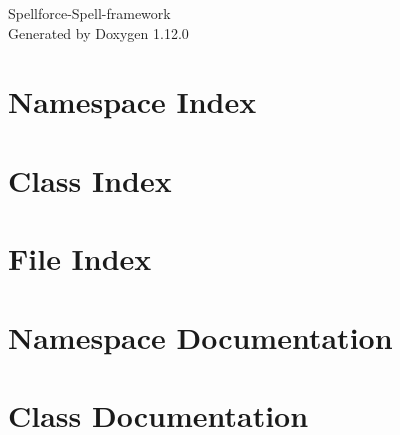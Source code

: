 \documentclass[twoside]{book}
\newcommand{\+}{\discretionary{\mbox{\scriptsize$\hookleftarrow$}}{}{}}
\newcommand{\clearemptydoublepage}{%
    \newpage{\pagestyle{empty}\cleardoublepage}%
  }
\begin{document}
  \raggedbottom
    \hypersetup{pageanchor=false,
                bookmarksnumbered=true,
                pdfencoding=unicode
               }
  \begin{titlepage}
  \vspace*{7cm}
  \begin{center}%
  {\Large Spellforce-\/\+Spell-\/framework}\\
  \vspace*{1cm}
  {\large Generated by Doxygen 1.12.0}\\
  \end{center}
  \end{titlepage}
  \clearemptydoublepage
  \tableofcontents
  \clearemptydoublepage
  \hypersetup{pageanchor=true}
\chapter{Namespace Index}

\chapter{Class Index}

\chapter{File Index}

\chapter{Namespace Documentation}

\chapter{Class Documentation}




\end{document}
